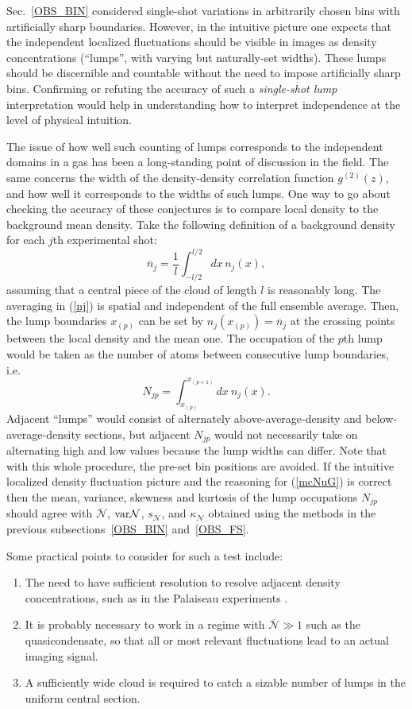 \documentclass[aps,twocolumn,pra,superscriptaddress,nofootinbib,amsmath,amssymb,floats,floatfix,english]{revtex4-1}
\newcommand{\mc}[1]{{\mathcal{#1}}}
\newcommand{\wb}[1]{{\overline{#1}}}
\newcommand{\eqn}[1]{(\ref{#1})}
\renewcommand{\eq}[2]{\begin{equation}\label{#1}#2\end{equation}}
\begin{document}
Sec.~\ref{OBS_BIN} considered single-shot variations in arbitrarily chosen bins with artificially sharp boundaries. However, in the intuitive picture one expects that the independent localized fluctuations should be visible in images as density concentrations (``lumps'', with varying but naturally-set widths).
These lumps should be discernible and countable without the need to impose artificially sharp bins.
Confirming or refuting the accuracy of such a \emph{single-shot lump} interpretation would help in understanding how to interpret independence at the level of physical intuition. 

The issue of  how well such counting of lumps corresponds to the  independent domains in a gas has been a long-standing point of discussion in the field.
The same concerns the width of the density-density correlation function $g^{(2)}(z)$, and how well it corresponds to the widths of such lumps.  
One way to go about checking the accuracy of these conjectures is to compare local density to the background mean density. 
Take the following definition of a background density for each $j$th experimental shot: 
\eq{nj}{
\wb{n}_j = \frac{1}{l}\int_{-l/2}^{l/2} dx\, n_j(x),
}
assuming that a central piece of the cloud of length $l$ is  reasonably long. 
The averaging in \eqn{nj}
is spatial and independent of the full ensemble average.
Then, the lump boundaries $x_{(p)}$ can be set  by
$n_j(x_{(p)})=\wb{n}_j$ 
at the crossing points between the local density and the mean one. 
The occupation of the $p$th lump would be taken as the number of atoms between consecutive lump boundaries, i.e.
\eq{njp}{
N_{jp} = \int_{x_{(p)}}^{x_{(p+1)}}dx\ n_j(x).
}
Adjacent ``lumps'' would consist of alternately above-average-density and below-average-density sections,
but adjacent $N_{jp}$ would not  necessarily take on alternating high and low values because the lump widths can differ.  
Note that with this whole procedure, the pre-set bin positions are avoided.
If the intuitive localized density fluctuation picture and the reasoning for \eqn{mcNuG} is correct then the mean, variance, skewness and kurtosis of the lump occupations $N_{jp}$ 
should agree with $\wb{\mc{N}}$, ${\rm var}\mc{N}$, $s_{\mc{N}}$, and $\kappa_{\mc{N}}$ obtained using the methods in the previous subsections~\ref{OBS_BIN} and~\ref{OBS_FS}.


Some practical points to consider for such a test include:
\begin{enumerate}
\item The need to have sufficient resolution to resolve adjacent density concentrations, such as in the Palaiseau experiments \cite{Armijo10,Jacqmin11,Armijo11,Jacqmin11,Armijo12,Jacqmin12}.
\item It is probably necessary to work in a regime with $\wb{\mc{N}}\gg1$ such as the quasicondensate, so that all or most relevant fluctuations lead to an actual imaging signal.
\item A sufficiently wide cloud is required to catch a sizable number of lumps in the uniform central section.
\end{enumerate}
\end{document}
